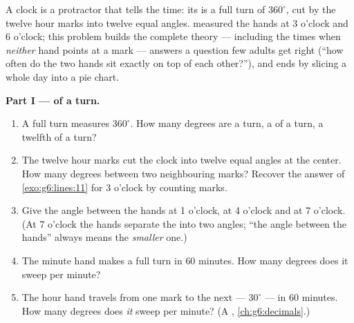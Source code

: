 \begin{problem}
\label{pb:g6:lines:1}
A clock is a protractor that tells the time: its  is a full
turn of $360^\circ$, cut by the twelve hour marks into twelve
equal angles.  measured the hands at
3 o'clock and 6 o'clock; this problem builds the complete theory
--- including the times when \emph{neither} hand points at a mark
--- answers a question few adults get right (``how often do the
two hands sit exactly on top of each other?''), and ends by
slicing a whole day into a pie chart.

\medskip
\noindent\textbf{Part I ---  of a turn.}
\begin{enumerate}
  \item A full turn measures $360^\circ$. How many degrees are
         a turn, a  of a turn, a twelfth of a turn?
  \item The twelve hour marks cut the clock  into twelve
        equal angles at the center. How many degrees between two
        neighbouring marks? Recover the answer of
        \cref{exo:g6:lines:11} for 3 o'clock by counting marks.
  \item Give the angle between the hands at 1 o'clock, at
        4 o'clock and at 7 o'clock. (At 7 o'clock the hands
        separate the  into two angles; ``the angle between
        the hands'' always means the \emph{smaller} one.)
  \item The minute hand makes a full turn in $60$ minutes. How
        many degrees does it sweep per minute?
  \item The hour hand travels from one mark to the next ---
        $30^\circ$ --- in $60$ minutes. How many degrees does
        \emph{it} sweep per minute? (A ,
        \cref{ch:g6:decimals}.)
\end{enumerate}


\end{problem}
